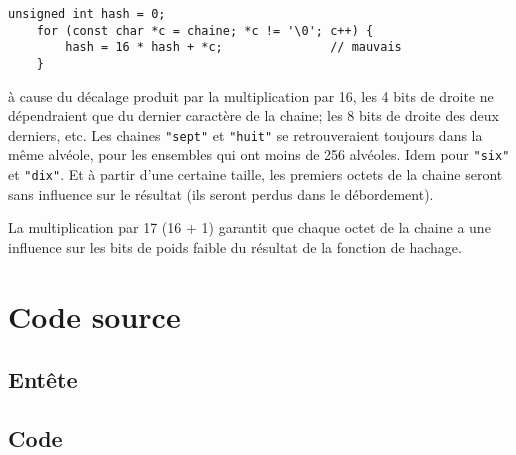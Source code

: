 \begin{lstlisting}[style=cextract]
unsigned int hash = 0;
    for (const char *c = chaine; *c != '\0'; c++) {
        hash = 16 * hash + *c;               // mauvais
    }
\end{lstlisting}

à cause du décalage produit par la multiplication par 16, les 4 bits
de droite ne dépendraient que du dernier caractère de la chaine; les 8
bits de droite des deux derniers, etc. Les chaines \texttt{"sept"} et
\texttt{"huit"} se retrouveraient toujours dans la même alvéole, pour
les ensembles qui ont moins de 256 alvéoles. Idem pour \texttt{"six"}
et \texttt{"dix"}. Et à partir d'une certaine taille, les premiers
octets de la chaine seront sans influence sur le résultat (ils seront
perdus dans le débordement).

La multiplication par 17 (16 + 1) garantit que chaque octet de la
chaine a une influence sur les bits de poids faible du résultat de la
fonction de hachage.

\section{Code source}

\subsection{Entête}




\subsection{Code}


